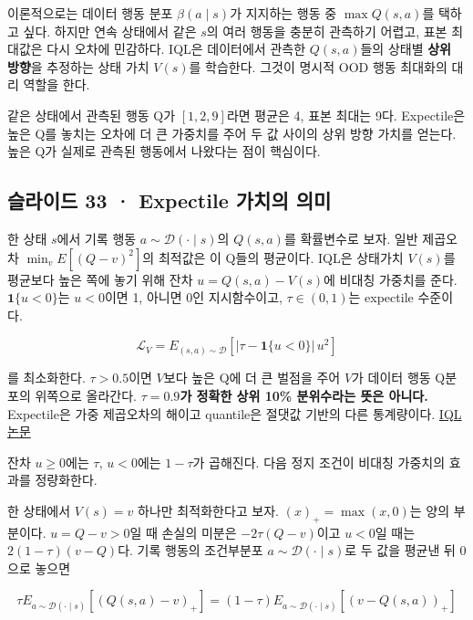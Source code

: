 \documentclass[11pt,a4paper]{article}
\begin{document}
이론적으로는 데이터 행동 분포 $\beta(a\mid s)$가 지지하는 행동 중 $\max Q(s,a)$를 택하고 싶다. 하지만 연속 상태에서 같은 $s$의 여러 행동을 충분히 관측하기 어렵고, 표본 최대값은 다시 오차에 민감하다. IQL은 데이터에서 관측한 $Q(s,a)$들의 상태별 \textbf{상위 방향}을 추정하는 상태 가치 $V(s)$를 학습한다. 그것이 명시적 OOD 행동 최대화의 대리 역할을 한다.\par

같은 상태에서 관측된 행동 Q가 $[1,2,9]$라면 평균은 4, 표본 최대는 9다. Expectile은 높은 Q를 놓치는 오차에 더 큰 가중치를 주어 두 값 사이의 상위 방향 가치를 얻는다. 높은 Q가 실제로 관측된 행동에서 나왔다는 점이 핵심이다.\par

\subsection{슬라이드 33 · Expectile 가치의 의미}

한 상태 $s$에서 기록 행동 $a\sim\mathcal D(\cdot\mid s)$의 $Q(s,a)$를 확률변수로 보자. 일반 제곱오차 $\min_vE[(Q-v)^2]$의 최적값은 이 Q들의 평균이다. IQL은 상태가치 $V(s)$를 평균보다 높은 쪽에 놓기 위해 잔차 $u=Q(s,a)-V(s)$에 비대칭 가중치를 준다. $\mathbf1\{u<0\}$는 $u<0$이면 1, 아니면 0인 지시함수이고, $\tau\in(0,1)$는 expectile 수준이다.\par

\[
\mathcal L_V=E_{(s,a)\sim\mathcal D}
\left[|\tau-\mathbf 1\{u<0\}|\,u^2\right]
\]

를 최소화한다. $\tau>0.5$이면 $V$보다 높은 Q에 더 큰 벌점을 주어 $V$가 데이터 행동 Q분포의 위쪽으로 올라간다. \textbf{$\tau=0.9$가 정확한 상위 10\% 분위수라는 뜻은 아니다.} Expectile은 가중 제곱오차의 해이고 quantile은 절댓값 기반의 다른 통계량이다. \href{https://arxiv.org/abs/2110.06169}{IQL 논문}\par

잔차 $u\ge0$에는 $\tau$, $u<0$에는 $1-\tau$가 곱해진다. 다음 정지 조건이 비대칭 가중치의 효과를 정량화한다.\par

한 상태에서 $V(s)=v$ 하나만 최적화한다고 보자. $(x)_+=\max(x,0)$는 양의 부분이다. $u=Q-v>0$일 때 손실의 미분은 $-2\tau(Q-v)$이고 $u<0$일 때는 $2(1-\tau)(v-Q)$다. 기록 행동의 조건부분포 $a\sim\mathcal D(\cdot\mid s)$로 두 값을 평균낸 뒤 0으로 놓으면\par

\[
\tau E_{a\sim\mathcal D(\cdot\mid s)}[(Q(s,a)-v)_+]
=(1-\tau)E_{a\sim\mathcal D(\cdot\mid s)}[(v-Q(s,a))_+]
\]
\end{document}
